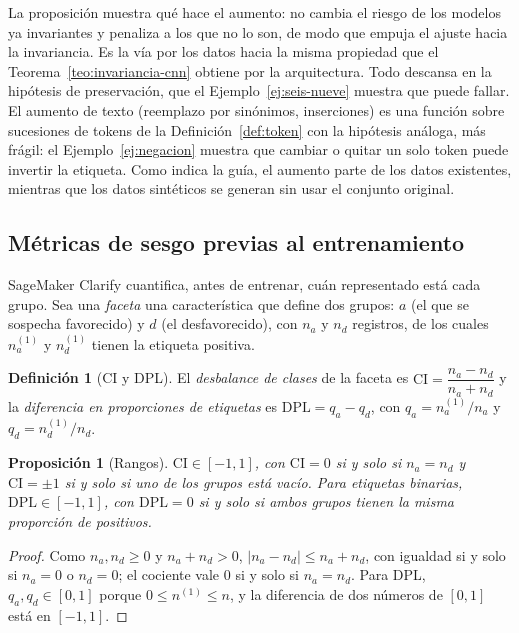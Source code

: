 \documentclass[11pt]{article}
\newtheorem{proposicion}[teorema]{Proposición}
\theoremstyle{definition}
\newtheorem{definicion}[teorema]{Definición}
\theoremstyle{remark}
\newcommand{\abs}[1]{\left\lvert #1\right\rvert}
\begin{document}
\noindent La proposición muestra qué hace el aumento: no cambia el riesgo de los modelos ya invariantes y penaliza a los que no lo son, de modo que empuja el ajuste hacia la invariancia. Es la vía por los datos hacia la misma propiedad que el Teorema~\ref{teo:invariancia-cnn} obtiene por la arquitectura. Todo descansa en la hipótesis de preservación, que el Ejemplo~\ref{ej:seis-nueve} muestra que puede fallar. El aumento de texto (reemplazo por sinónimos, inserciones) es una función sobre sucesiones de tokens de la Definición~\ref{def:token} con la hipótesis análoga, más frágil: el Ejemplo~\ref{ej:negacion} muestra que cambiar o quitar un solo token puede invertir la etiqueta. Como indica la guía, el aumento parte de los datos existentes, mientras que los datos sintéticos se generan sin usar el conjunto original.

\subsection{Métricas de sesgo previas al entrenamiento}\label{sec:clarify}

\noindent SageMaker Clarify cuantifica, antes de entrenar, cuán representado está cada grupo. Sea una \emph{faceta} una característica que define dos grupos: $a$ (el que se sospecha favorecido) y $d$ (el desfavorecido), con $n_a$ y $n_d$ registros, de los cuales $n_a^{(1)}$ y $n_d^{(1)}$ tienen la etiqueta positiva.

\begin{definicion}[CI y DPL]\label{def:ci}
\noindent El \emph{desbalance de clases} de la faceta es $\mathrm{CI}=\dfrac{n_a-n_d}{n_a+n_d}$ y la \emph{diferencia en proporciones de etiquetas} es $\mathrm{DPL}=q_a-q_d$, con $q_a=n_a^{(1)}/n_a$ y $q_d=n_d^{(1)}/n_d$.
\end{definicion}

\begin{proposicion}[Rangos]\label{prop:ci}
\noindent $\mathrm{CI}\in[-1,1]$, con $\mathrm{CI}=0$ si y solo si $n_a=n_d$ y $\mathrm{CI}=\pm1$ si y solo si uno de los grupos está vacío. Para etiquetas binarias, $\mathrm{DPL}\in[-1,1]$, con $\mathrm{DPL}=0$ si y solo si ambos grupos tienen la misma proporción de positivos.
\end{proposicion}
\begin{proof}
\noindent Como $n_a,n_d\ge0$ y $n_a+n_d>0$, $\abs{n_a-n_d}\le n_a+n_d$, con igualdad si y solo si $n_a=0$ o $n_d=0$; el cociente vale $0$ si y solo si $n_a=n_d$. Para DPL, $q_a,q_d\in[0,1]$ porque $0\le n^{(1)}\le n$, y la diferencia de dos números de $[0,1]$ está en $[-1,1]$.
\end{proof}
\end{document}
